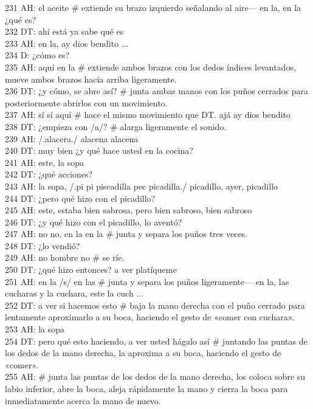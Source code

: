 231 AH: el aceite \# extiende su brazo izquierdo señalando al aire--- en la, en la ¿qué es?\\
232 DT: ahí está ya sabe qué es\\
233 AH: en la, ay dios bendito ...\\
234 D: ¿cómo es?\\
235 AH: aquí en la \# extiende ambos brazos con los dedos índices levantados, mueve ambos brazos hacia arriba ligeramente.\\
236 DT: ¿y cómo, se abre así? \# junta ambas manos con los puños cerrados para posteriormente abrirlos con un movimiento.\\
237 AH: sí sí aquí \# hace el mismo movimiento que DT. ajá ay dios bendito\\
238 DT: ¿empieza con /a/? \# alarga ligeramente el sonido.\\
239 AH: /.alacera./ alacena alacena\\
240 DT: muy bien ¿y qué hace usted en la cocina?\\
241 AH: este, la sopa\\
242 DT: ¿qué acciones?\\
243 AH: la sopa, /.pi pi piscadilla pec picadilla./ picadillo, ayer, picadillo\\
244 DT: ¿pero qué hizo con el picadillo?\\
245 AH: este, estaba bien sabrosa, pero bien sabroso, bien sabroso\\
246 DT: ¿y qué hizo con el picadillo, lo aventó?\\
247 AH: no no, en la en la \# junta y separa los puños tres veces.\\
248 DT: ¿lo vendió?\\
249 AH: no hombre no \# se ríe.\\
250 DT: ¿qué hizo entonces? a ver platíqueme\\
251 AH: en la /s/ en las \# junta y separa los puños ligeramente--- en la, las cucharas y la cuchara, este la cuch ...\\
252 DT: a ver si hacemos esto \# baja la mano derecha con el puño cerrado para lentamente aproximarlo a su boca, haciendo el gesto de «comer con cuchara».\\
253 AH: la sopa\\
254 DT: pero qué esto haciendo, a ver usted hágalo así \# juntando las puntas de los dedos de la mano derecha, la aproxima a su boca, haciendo el gesto de «comer».\\
255 AH: \# junta las puntas de los dedos de la mano derecha, los coloca sobre su labio inferior, abre la boca, aleja rápidamente la mano y cierra la boca para inmediatamente acerca la mano de nuevo.\\
